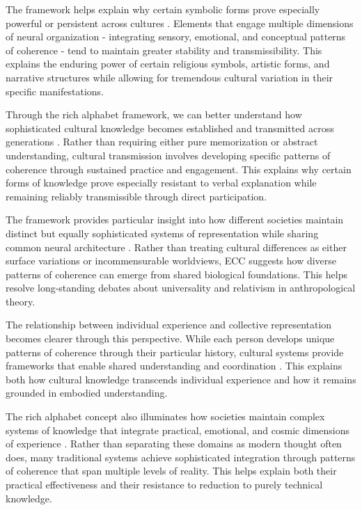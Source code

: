 \begin{refsection}
The framework helps explain why certain symbolic forms prove especially powerful or persistent across cultures \cite{armstrong1981powers}. Elements that engage multiple dimensions of neural organization - integrating sensory, emotional, and conceptual patterns of coherence - tend to maintain greater stability and transmissibility. This explains the enduring power of certain religious symbols, artistic forms, and narrative structures while allowing for tremendous cultural variation in their specific manifestations.

Through the rich alphabet framework, we can better understand how sophisticated cultural knowledge becomes established and transmitted across generations \cite{whitehouse2004modes}. Rather than requiring either pure memorization or abstract understanding, cultural transmission involves developing specific patterns of coherence through sustained practice and engagement. This explains why certain forms of knowledge prove especially resistant to verbal explanation while remaining reliably transmissible through direct participation.

The framework provides particular insight into how different societies maintain distinct but equally sophisticated systems of representation while sharing common neural architecture \cite{bateson1972steps}. Rather than treating cultural differences as either surface variations or incommensurable worldviews, ECC suggests how diverse patterns of coherence can emerge from shared biological foundations. This helps resolve long-standing debates about universality and relativism in anthropological theory.

The relationship between individual experience and collective representation becomes clearer through this perspective. While each person develops unique patterns of coherence through their particular history, cultural systems provide frameworks that enable shared understanding and coordination \cite{shore1996culture}. This explains both how cultural knowledge transcends individual experience and how it remains grounded in embodied understanding.

The rich alphabet concept also illuminates how societies maintain complex systems of knowledge that integrate practical, emotional, and cosmic dimensions of experience \cite{wagner1981invention}. Rather than separating these domains as modern thought often does, many traditional systems achieve sophisticated integration through patterns of coherence that span multiple levels of reality. This helps explain both their practical effectiveness and their resistance to reduction to purely technical knowledge.


\end{refsection}
